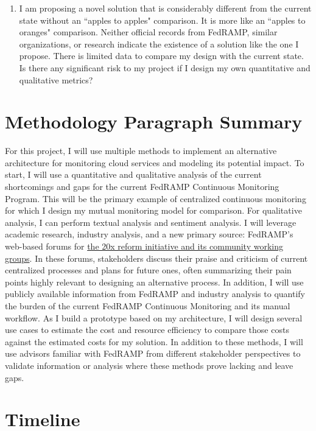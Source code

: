 \documentclass{jdf}
\begin{document}
\begin{enumerate}
    \item I am proposing a novel solution that is considerably different from the current state without an ``apples to apples" comparison. It is more like an ``apples to oranges" comparison. Neither official records from FedRAMP, similar organizations, or research indicate the existence of a solution like the one I propose. There is limited data to compare my design with the current state. Is there any significant risk to my project if I design my own quantitative and qualitative metrics?    
\end{enumerate}

\section*{Methodology Paragraph Summary}

For this project, I will use multiple methods to implement an alternative architecture for monitoring cloud services and modeling its potential impact. To start, I will use a quantitative and qualitative analysis of the current shortcomings and gaps for the current FedRAMP Continuous Monitoring Program. This will be the primary example of centralized continuous monitoring for which I design my mutual monitoring model for comparison. For qualitative analysis, I can perform textual analysis and sentiment analysis. I will leverage academic research, industry analysis, and a new primary source: FedRAMP's web-based forums for \hyperlink{https://www.fedramp.gov/20x/working-groups/}{the 20x reform initiative and its community working groups}. In these forums, stakeholders discuss their praise and criticism of current centralized processes and plans for future ones, often summarizing their pain points highly relevant to designing an alternative process. In addition, I will use publicly available information from FedRAMP and industry analysis to quantify the burden of the current FedRAMP Continuous Monitoring and its manual workflow. As I build a prototype based on my architecture, I will design several use cases to estimate the cost and resource efficiency to compare those costs against the estimated costs for my solution. In addition to these methods, I will use advisors familiar with FedRAMP from different stakeholder perspectives to validate information or analysis where these methods prove lacking and leave gaps.

\section*{Timeline}
\end{document}
